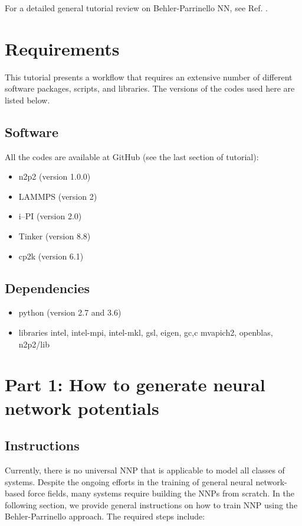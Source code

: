 \documentclass[12pt]{article}
\begin{document}
For a detailed general tutorial review on Behler-Parrinello NN, see Ref. . 


\newpage
{}
\section{Requirements}
This tutorial presents a workflow that requires an extensive number of different software packages, scripts, and libraries. The versions of the codes used here are listed below.
\subsection{Software}
All the codes are available at GitHub (see the last section of tutorial):
\begin{itemize}
    \item n2p2 (version 1.0.0)
    \item LAMMPS (version 2)
    \item i--PI (version 2.0)
    \item Tinker (version 8.8)
    \item cp2k (version 6.1)
\end{itemize}

\subsection{Dependencies}
\begin{itemize}
    \item python (version 2.7 and 3.6)
    \item libraries intel, intel-mpi, intel-mkl, gsl, eigen, gc,c mvapich2, openblas, n2p2/lib
\end{itemize}

\newpage

\section{Part 1: How to generate neural network potentials}
\subsection*{Instructions}

Currently, there is no universal NNP that is applicable to model all classes of systems. Despite the ongoing efforts in the training of general neural network-based force fields, many systems require building the NNPs from scratch. In the following section, we provide general instructions on how to train NNP using the Behler-Parrinello approach. The required steps include: 
\end{document}
